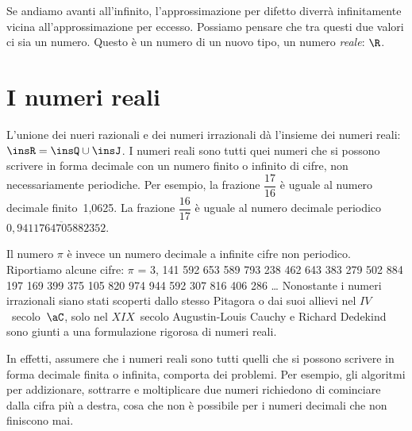Se andiamo avanti all'infinito, l'approssimazione per difetto diverrà
infinitamente vicina all'approssimazione per eccesso.
Possiamo pensare che tra questi due valori ci sia un numero. Questo è un
numero di un nuovo tipo, un numero \emph{reale}: \(\R\).

\section{I numeri reali}
\label{sec:radicali_reali}

L'unione dei nueri razionali e dei numeri irrazionali dà l'insieme dei
numeri reali: $\insR=\insQ \cup \insJ$.
I numeri reali sono tutti quei numeri che si possono scrivere in forma
decimale con un numero finito o infinito di cifre, non necessariamente
periodiche.
Per esempio, la frazione $\dfrac{17}{16}$ è uguale al numero decimale
finito~1,0625.
La frazione $\dfrac{16}{17}$ è uguale al numero decimale periodico
$0,\overline{9411764705882352}$.

Il numero $\pi$ è invece un numero decimale a infinite cifre non periodico.
Riportiamo alcune cifre:
$\pi $ = 3, 141 592 653 589 793 238 462 643 383 279 502 884 197 169 399 375
105 820 974 944 592 307 816 406 286
\ldots
Nonostante i numeri irrazionali siano stati scoperti dallo stesso Pitagora o
dai suoi allievi nel $IV$~secolo~$\aC$, solo nel $XIX$~secolo Augustin-Louis
Cauchy e Richard Dedekind sono giunti a una formulazione rigorosa di numeri
reali.

In effetti, assumere che i numeri reali sono tutti quelli che si possono
scrivere in forma decimale finita o infinita,  comporta dei problemi.
Per esempio, gli algoritmi per addizionare,
sottrarre e moltiplicare due numeri richiedono di cominciare dalla cifra
più a destra, cosa che non è possibile per i numeri decimali che non
finiscono mai.

